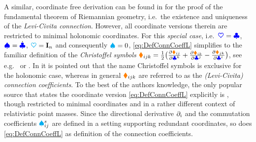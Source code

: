 A similar, coordinate free derivation can be found in \cite[proof of Theorem 2.7.6]{Abraham:FoundationsOfMechanics} for the proof of the fundamental theorem of Riemannian geometry, i.e.\ the existence and uniqueness of the \textit{Levi-Civita connection}.
However, all coordinate versions therein are restricted to minimal holonomic coordinates.
For this \textit{special case}, i.e.\ $\sysCoord = \genCoord$, $\sysVel = \genCoordd$, $\kinMat=\idMat[\dimConfigSpace]$ and consequently $\BoltzSym{}{}{} = 0$, \eqref{eq:DefConnCoeffL} simplifies to the familiar definition of the \textit{Christoffel symbols} $\ConnCoeffL{\LidxI}{\LidxII}{\LidxIII} = \tfrac{1}{2}\big( \pdiff[\sysInertiaMatCoeff{\LidxI\LidxII}]{\genCoordCoeff{\LidxIII}} + \pdiff[\sysInertiaMatCoeff{\LidxI\LidxIII}]{\genCoordCoeff{\LidxII}} - \pdiff[\sysInertiaMatCoeff{\LidxII\LidxIII}]{\genCoordCoeff{\LidxI}} \big)$, see e.g.\ \cite[p.\,145]{Abraham:FoundationsOfMechanics} or \cite[Vol.\,2, p.\,221]{Spivak:DiffGeo}.
In \cite[sec.\,9.2]{Frankel:GeometryOfPhysics} it is pointed out that the name Christoffel symbols is exclusive for the holonomic case, whereas in general $\ConnCoeffL{\LidxI}{\LidxII}{\LidxIII}$ are referred to as the \textit{(Levi-Civita) connection coefficients}.
To the best of the authors knowledge, the only popular source that states the coordinate version \eqref{eq:DefConnCoeffL} explicitly is \cite[eq.\ 8.24]{Misner:Gravitation}, though restricted to minimal coordinates and in a rather different context of relativistic point masses.
Since the directional derivative $\dirDiff{\LidxI}$ and the commutation coefficients $\BoltzSym{\LidxV}{\LidxI}{\LidxII}$ are defined in a setting supporting redundant coordinates, so does \eqref{eq:DefConnCoeffL} as definition of the connection coefficients.




